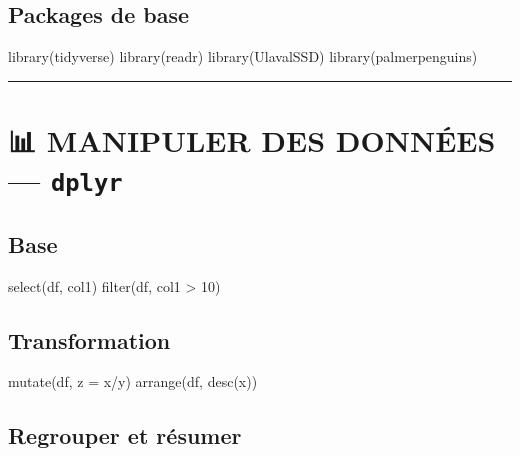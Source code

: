 \documentclass[
  8pt,
  letterpaper,
  DIV=11,
  numbers=noendperiod]{scrartcl}
\newenvironment{Shaded}{\begin{snugshade}}{\end{snugshade}}
\newcommand{\AttributeTok}[1]{\textcolor[rgb]{0.40,0.45,0.13}{#1}}
\newcommand{\DecValTok}[1]{\textcolor[rgb]{0.68,0.00,0.00}{#1}}
\newcommand{\FunctionTok}[1]{\textcolor[rgb]{0.28,0.35,0.67}{#1}}
\newcommand{\NormalTok}[1]{\textcolor[rgb]{0.00,0.23,0.31}{#1}}
\newcommand{\SpecialCharTok}[1]{\textcolor[rgb]{0.37,0.37,0.37}{#1}}
\begin{document}
\subsection{Packages de base}\label{packages-de-base}

\begin{Shaded}
\begin{Highlighting}[]
\FunctionTok{library}\NormalTok{(tidyverse)}
\FunctionTok{library}\NormalTok{(readr)}
\FunctionTok{library}\NormalTok{(UlavalSSD)}
\FunctionTok{library}\NormalTok{(palmerpenguins)}
\end{Highlighting}
\end{Shaded}

\begin{center}\rule{0.5\linewidth}{0.5pt}\end{center}

\section{\texorpdfstring{📊 MANIPULER DES DONNÉES ---
\texttt{dplyr}}{📊 MANIPULER DES DONNÉES --- dplyr}}\label{manipuler-des-donnuxe9es-dplyr}

\subsection{Base}\label{base}

\begin{Shaded}
\begin{Highlighting}[]
\FunctionTok{select}\NormalTok{(df, col1)}
\FunctionTok{filter}\NormalTok{(df, col1 }\SpecialCharTok{\textgreater{}} \DecValTok{10}\NormalTok{)}
\end{Highlighting}
\end{Shaded}

\subsection{Transformation}\label{transformation}

\begin{Shaded}
\begin{Highlighting}[]
\FunctionTok{mutate}\NormalTok{(df, }\AttributeTok{z =}\NormalTok{ x}\SpecialCharTok{/}\NormalTok{y)}
\FunctionTok{arrange}\NormalTok{(df, }\FunctionTok{desc}\NormalTok{(x))}
\end{Highlighting}
\end{Shaded}

\subsection{Regrouper et résumer}\label{regrouper-et-ruxe9sumer}
\end{document}

